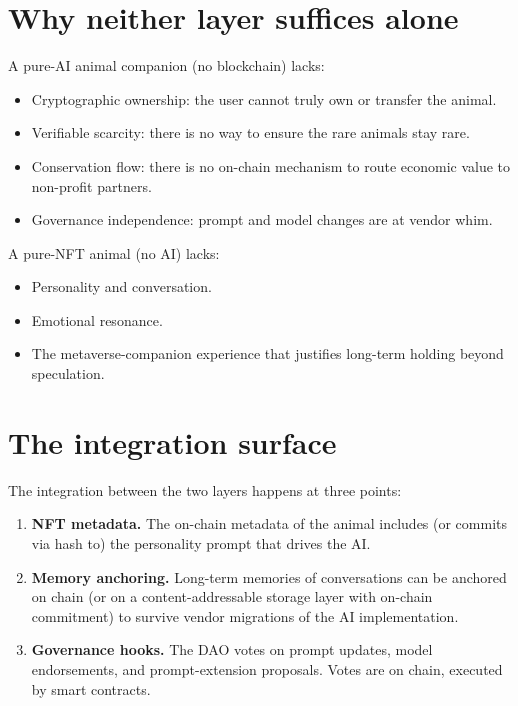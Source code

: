 \documentclass[11pt,letterpaper]{article}
\begin{document}
\section{Why neither layer suffices alone}

A pure-AI animal companion (no blockchain) lacks:

\begin{itemize}
  \item Cryptographic ownership: the user cannot truly own or transfer the animal.
  \item Verifiable scarcity: there is no way to ensure the rare animals stay rare.
  \item Conservation flow: there is no on-chain mechanism to route economic value to non-profit partners.
  \item Governance independence: prompt and model changes are at vendor whim.
\end{itemize}

A pure-NFT animal (no AI) lacks:

\begin{itemize}
  \item Personality and conversation.
  \item Emotional resonance.
  \item The metaverse-companion experience that justifies long-term holding beyond speculation.
\end{itemize}

\section{The integration surface}

The integration between the two layers happens at three points:

\begin{enumerate}
  \item \textbf{NFT metadata.} The on-chain metadata of the animal includes (or commits via hash to) the personality prompt that drives the AI.
  \item \textbf{Memory anchoring.} Long-term memories of conversations can be anchored on chain (or on a content-addressable storage layer with on-chain commitment) to survive vendor migrations of the AI implementation.
  \item \textbf{Governance hooks.} The DAO votes on prompt updates, model endorsements, and prompt-extension proposals. Votes are on chain, executed by smart contracts.
\end{enumerate}
\end{document}
